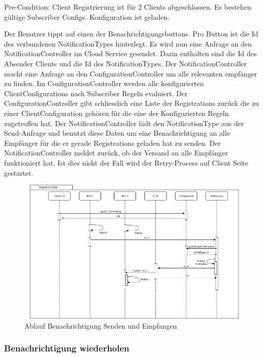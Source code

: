 Pre-Condition: Client Registrierung ist für 2 Clients abgeschlossen. Es bestehen gültige Subscriber Configs. Konfiguration ist geladen.

Der Benutzer tippt auf einen der Benachrichtigungsbuttons.
Pro Button ist die Id des verbundenen NotificationTypes hinterlegt.
Es wird nun eine Anfrage an den NotificationController im Cloud Service gesendet.
Darin enthalten sind die Id des Absender Clients und die Id des NotificationTypes.
Der NotificationController macht eine Anfrage an den ConfigurationController um alle relevanten empfänger zu finden.
Im ConfigurationController werden alle konfigurierten ClientConfigurations nach Subscriber Regeln evaluiert.
Der ConfigurationController gibt schliesslich eine Liste der Registrations zurück die zu einer ClientConfiguration gehören für die eine der Konfigurierten Regeln zugetroffen hat.
Der NotificationController lädt den NotificationType aus der Send-Anfrage und benutzt diese Daten um eine Benachrichtigung an alle Empfänger für die er gerade Registrations geladen hat zu senden.
Der NotificationController meldet zurück, ob der Versand an alle Empfänger funktioniert hat.
Ist dies nicht der Fall wird der Retry-Process auf Client Seite gestartet.

\begin{figure}[h]
    \centering
    \begin{minipage}[b]{1.0\textwidth}
        \includegraphics[width=\textwidth]{graphics/Sequence_Notification_Send}
        \caption{Ablauf Benachrichtigung Senden und Empfangen}
    \end{minipage}
\end{figure}


\clearpage
\subsubsection*{Benachrichtigung wiederholen}

